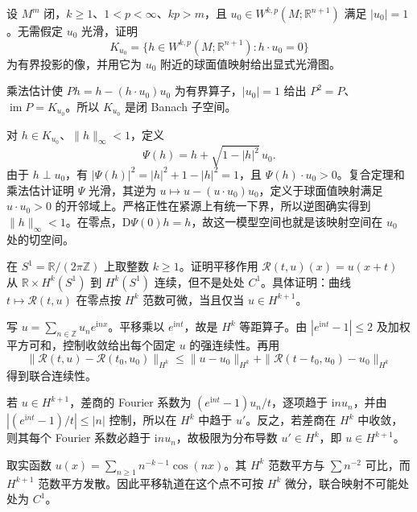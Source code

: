 \begin{exercise}\label{g3:ex:sobolev-sphere-chart}
	设 \(M^m\) 闭，\(k\ge1\)、\(1<p<\infty\)、\(kp>m\)，且 \(u_0\in W^{k,p}(M;\mathbb R^{n+1})\) 满足 \(|u_0|=1\)。无需假定 \(u_0\) 光滑，证明
	\[
		K_{u_0}=\{h\in W^{k,p}(M;\mathbb R^{n+1}):h\cdot u_0=0\}
	\]
	为有界投影的像，并用它为 \(u_0\) 附近的球面值映射给出显式光滑图。
\end{exercise}
\begin{solution}
	乘法估计使 \(P h=h-(h\cdot u_0)u_0\) 为有界算子，\(|u_0|=1\) 给出 \(P^2=P\)、\(\operatorname{im}P=K_{u_0}\)。所以 \(K_{u_0}\) 是闭 Banach 子空间。

	对 \(h\in K_{u_0}\)、\(\|h\|_\infty<1\)，定义
	\[
		\Psi(h)=h+\sqrt{1-|h|^2}\,u_0.
	\]
	由于 \(h\perp u_0\)，有 \(|\Psi(h)|^2=|h|^2+1-|h|^2=1\)，且 \(\Psi(h)\cdot u_0>0\)。复合定理和乘法估计证明 \(\Psi\) 光滑，其逆为 \(u\mapsto u-(u\cdot u_0)u_0\)，定义于球面值映射满足 \(u\cdot u_0>0\) 的开邻域上。严格正性在紧源上有统一下界，所以逆图确实得到 \(\|h\|_\infty<1\)。在零点，\(\mathrm D\Psi(0)h=h\)，故这一模型空间也就是该映射空间在 \(u_0\) 处的切空间。
\end{solution}

\begin{exercise}\label{g3:ex:sobolev-translation-loss}
	在 \(S^1=\mathbb R/(2\pi\mathbb Z)\) 上取整数 \(k\ge1\)。证明平移作用
	\(\mathcal R(t,u)(x)=u(x+t)\) 从 \(\mathbb R\times H^k(S^1)\) 到 \(H^k(S^1)\) 连续，但不是处处 \(C^1\)。具体证明：曲线 \(t\mapsto\mathcal R(t,u)\) 在零点按 \(H^k\) 范数可微，当且仅当 \(u\in H^{k+1}\)。
\end{exercise}
\begin{solution}
	写 \(u=\sum_{n\in\mathbb Z}u_ne^{\mathrm inx}\)。平移乘以 \(e^{\mathrm int}\)，故是 \(H^k\) 等距算子。由
	\(|e^{\mathrm int}-1|\le2\) 及加权平方可和，控制收敛给出每个固定 \(u\) 的强连续性。再用
	\[
		\|\mathcal R(t,u)-\mathcal R(t_0,u_0)\|_{H^k}
		\le\|u-u_0\|_{H^k}
		+\|\mathcal R(t-t_0,u_0)-u_0\|_{H^k}
	\]
	得到联合连续性。

	若 \(u\in H^{k+1}\)，差商的 Fourier 系数为 \((e^{\mathrm int}-1)u_n/t\)，逐项趋于 \(\mathrm in u_n\)，并由 \(|(e^{\mathrm int}-1)/t|\le|n|\) 控制，所以在 \(H^k\) 中趋于 \(u'\)。反之，若差商在 \(H^k\) 中收敛，则其每个 Fourier 系数必趋于 \(\mathrm in u_n\)，故极限为分布导数 \(u'\in H^k\)，即 \(u\in H^{k+1}\)。

	取实函数 \(u(x)=\sum_{n\ge1}n^{-k-1}\cos(nx)\)。其 \(H^k\) 范数平方与 \(\sum n^{-2}\) 可比，而 \(H^{k+1}\) 范数平方发散。因此平移轨道在这个点不可按 \(H^k\) 微分，联合映射不可能处处为 \(C^1\)。
\end{solution}

